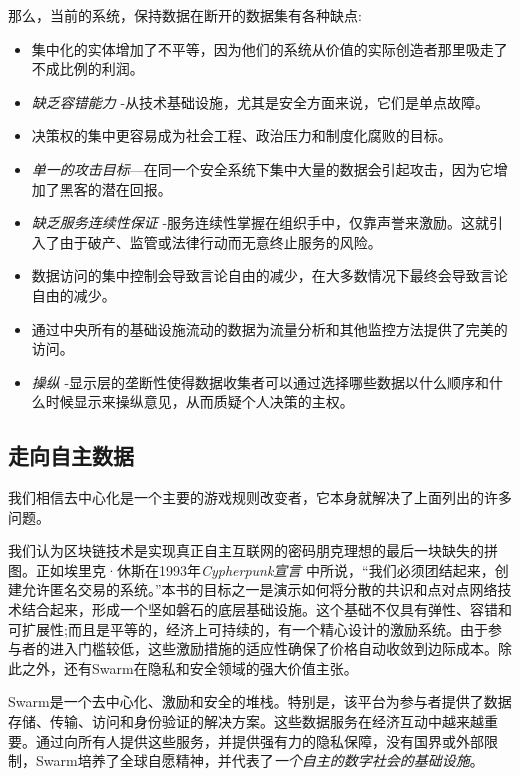 那么，当前的系统，保持数据在断开的数据集有各种缺点: 

\begin{itemize}
    \item 集中化的实体增加了不平等，因为他们的系统从价值的实际创造者那里吸走了不成比例的利润。
    \item \emph{缺乏容错能力} -从技术基础设施，尤其是安全方面来说，它们是单点故障。
    \item 决策权的集中更容易成为社会工程、政治压力和制度化腐败的目标。
    \item \emph{单一的攻击目标}—在同一个安全系统下集中大量的数据会引起攻击，因为它增加了黑客的潜在回报。 
    \item \emph{缺乏服务连续性保证} -服务连续性掌握在组织手中，仅靠声誉来激励。这就引入了由于破产、监管或法律行动而无意终止服务的风险。
    \item 数据访问的集中控制会导致言论自由的减少，在大多数情况下最终会导致言论自由的减少。
    \item 通过中央所有的基础设施流动的数据为流量分析和其他监控方法提供了完美的访问。
    \item \emph{操纵} -显示层的垄断性使得数据收集者可以通过选择哪些数据以什么顺序和什么时候显示来操纵意见，从而质疑个人决策的主权。
\end{itemize}


\subsection{走向自主数据\statusgreen} \label{sec:selfsovereigndata}

我们相信去中心化是一个主要的游戏规则改变者，它本身就解决了上面列出的许多问题。

我们认为区块链技术是实现真正自主互联网的密码朋克理想的最后一块缺失的拼图。正如埃里克·休斯在1993年\emph{Cypherpunk宣言} \cite{hughes1993}中所说，“我们必须团结起来，创建允许匿名交易的系统。”本书的目标之一是演示如何将分散的共识和点对点网络技术结合起来，形成一个坚如磐石的底层基础设施。这个基础不仅具有弹性、容错和可扩展性;而且是平等的，经济上可持续的，有一个精心设计的激励系统。由于参与者的进入门槛较低，这些激励措施的适应性确保了价格自动收敛到边际成本。除此之外，还有Swarm在隐私和安全领域的强大价值主张。

Swarm是一个去中心化、激励和安全的堆栈。特别是，该平台为参与者提供了数据存储、传输、访问和身份验证的解决方案。这些数据服务在经济互动中越来越重要。通过向所有人提供这些服务，并提供强有力的隐私保障，没有国界或外部限制，Swarm培养了全球自愿精神，并代表了\emph{一个自主的数字社会的基础设施}。

